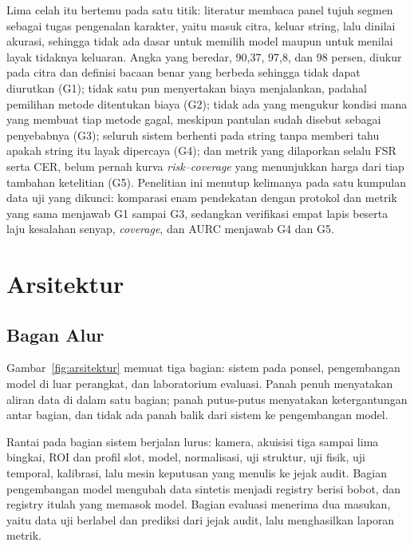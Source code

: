 \documentclass[12pt,a4paper,oneside]{report}
\newcommand{\parencite}[1]{\citep{#1}}
\begin{document}
Lima celah itu bertemu pada satu titik: literatur membaca panel tujuh segmen
sebagai tugas pengenalan karakter, yaitu masuk citra, keluar string, lalu dinilai
akurasi, sehingga tidak ada dasar untuk memilih model maupun untuk menilai layak
tidaknya keluaran. Angka yang beredar, 90,37, 97,8, dan 98 persen, diukur pada
citra dan definisi bacaan benar yang berbeda sehingga tidak dapat diurutkan (G1);
tidak satu pun menyertakan biaya menjalankan, padahal pemilihan metode ditentukan
biaya (G2); tidak ada yang mengukur kondisi mana yang membuat tiap metode gagal,
meskipun pantulan sudah disebut sebagai penyebabnya \parencite{low2024detecting}
(G3); seluruh sistem berhenti pada string tanpa memberi tahu apakah string itu
layak dipercaya (G4); dan metrik yang dilaporkan selalu FSR serta CER, belum pernah
kurva \textit{risk--coverage} yang menunjukkan harga dari tiap tambahan ketelitian
(G5). Penelitian ini menutup kelimanya pada satu kumpulan data uji yang dikunci:
komparasi enam pendekatan dengan protokol dan metrik yang sama menjawab G1 sampai
G3, sedangkan verifikasi empat lapis beserta laju kesalahan senyap,
\textit{coverage}, dan AURC menjawab G4 dan G5.

\chapter{Arsitektur}

\section{Bagan Alur}

Gambar~\ref{fig:arsitektur} memuat tiga bagian: sistem pada ponsel, pengembangan
model di luar perangkat, dan laboratorium evaluasi. Panah penuh menyatakan aliran
data di dalam satu bagian; panah putus-putus menyatakan ketergantungan antar
bagian, dan tidak ada panah balik dari sistem ke pengembangan model.

Rantai pada bagian sistem berjalan lurus: kamera, akuisisi tiga sampai lima
bingkai, ROI dan profil slot, model, normalisasi, uji struktur, uji fisik, uji
temporal, kalibrasi, lalu mesin keputusan yang menulis ke jejak audit. Bagian
pengembangan model mengubah data sintetis menjadi registry berisi bobot, dan
registry itulah yang memasok model. Bagian evaluasi menerima dua masukan, yaitu
data uji berlabel dan prediksi dari jejak audit, lalu menghasilkan laporan metrik.
\end{document}
